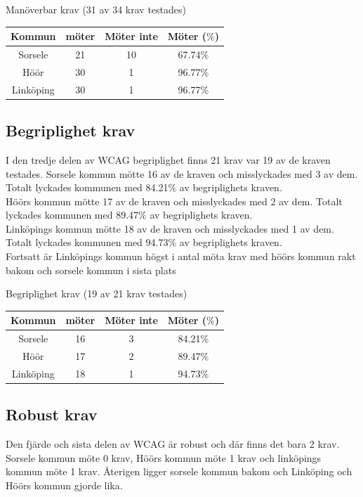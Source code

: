 \documentclass[11p]{article}
\begin{document}
    \begin{center}
    Manöverbar krav (31 av 34 krav testades)

    \begin{tabular}{ |c|c|c|c|}
        \hline
        Kommun & möter & Möter inte & Möter ($\%$) \\  \hline
        Sorsele & 21 & 10 & 67.74$\%$ \\ \hline
        Höör & 30 & 1 & 96.77$\%$ \\ \hline
        Linköping & 30 & 1 & 96.77$\%$ \\ \hline
    \end{tabular}
    \end{center}

    \subsection{Begriplighet krav}
    I den tredje delen av WCAG begriplighet finns 21 krav var 19 av de kraven testades.
    Sorsele kommun mötte 16 av de kraven och misslyckades med 3 av dem.
    Totalt lyckades kommunen med 84.21$\%$ av begriplighets kraven.
    \\Höörs kommun mötte 17 av de kraven och misslyckades med 2 av dem.
    Totalt lyckades kommunen med 89.47$\%$ av begriplighets kraven.
    \\Linköpings kommun mötte 18 av de kraven och misslyckades med 1 av dem.
    Totalt lyckades kommunen med 94.73$\%$ av begriplighets kraven.
    \\Fortsatt är Linköpings kommun högst i antal möta krav med höörs kommun rakt bakom och sorsele kommun i sista plats

    \begin{center}
    Begriplighet krav (19 av 21 krav testades)

    \begin{tabular}{ |c|c|c|c|}
        \hline
        Kommun & möter & Möter inte & Möter ($\%$) \\  \hline
        Sorsele & 16 & 3 & 84.21$\%$ \\ \hline
        Höör & 17 & 2 & 89.47$\%$ \\ \hline
        Linköping & 18 & 1 & 94.73$\%$ \\ \hline
    \end{tabular}
    \end{center}

    \subsection{Robust krav}
    Den fjärde och sista delen av WCAG är robust och där finns det bara 2 krav.
    Sorsele kommun möte 0 krav, Höörs kommun möte 1 krav och linköpings kommun möte 1 krav.
    Återigen ligger sorsele kommun bakom och Linköping och Höörs kommun gjorde lika.
\end{document}
